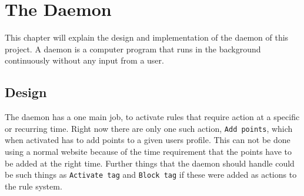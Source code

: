 \chapter{The Daemon}
This chapter will explain the design and implementation of the daemon of this project. A daemon is a computer program that runs in the background continuously without any input from a user.
\section{Design}
The daemon has a one main job, to activate rules that require action at a specific or recurring time. Right now there are only one such action, \texttt{Add points}, which when activated has to add points to a given users profile. This can not be done using a normal website because of the time requirement that the points have to be added at the right time. Further things that the daemon should handle could be such things as \texttt{Activate tag} and \texttt{Block tag} if these were added as actions to the rule system.

